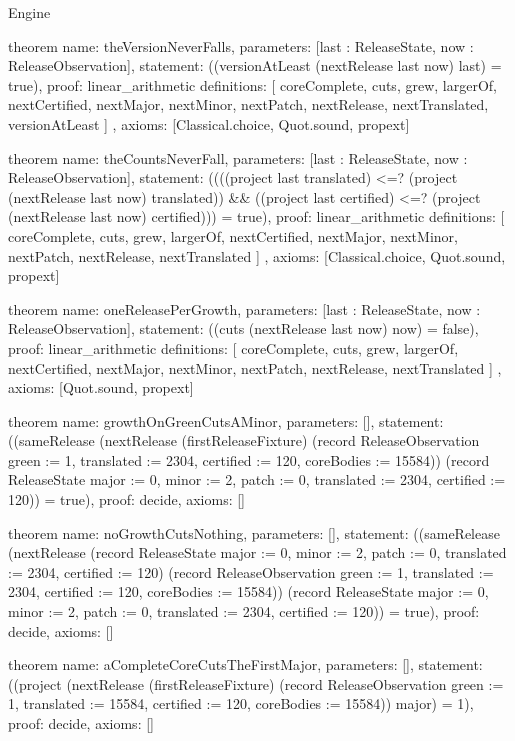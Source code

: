 \begin{lexlean}{Engine}
\begin{semanticmodule}
theorem{
  name: theVersionNeverFalls,
  parameters: [last : ReleaseState, now : ReleaseObservation],
  statement: ((versionAtLeast (nextRelease last now) last) = true),
  proof: linear_arithmetic{
    definitions: [
      coreComplete,
      cuts,
      grew,
      largerOf,
      nextCertified,
      nextMajor,
      nextMinor,
      nextPatch,
      nextRelease,
      nextTranslated,
      versionAtLeast
    ]
  },
  axioms: [Classical.choice, Quot.sound, propext]
}

theorem{
  name: theCountsNeverFall,
  parameters: [last : ReleaseState, now : ReleaseObservation],
  statement: ((((project last translated) <=? (project (nextRelease last now) translated)) && ((project last certified) <=? (project (nextRelease last now) certified))) = true),
  proof: linear_arithmetic{
    definitions: [
      coreComplete,
      cuts,
      grew,
      largerOf,
      nextCertified,
      nextMajor,
      nextMinor,
      nextPatch,
      nextRelease,
      nextTranslated
    ]
  },
  axioms: [Classical.choice, Quot.sound, propext]
}

theorem{
  name: oneReleasePerGrowth,
  parameters: [last : ReleaseState, now : ReleaseObservation],
  statement: ((cuts (nextRelease last now) now) = false),
  proof: linear_arithmetic{
    definitions: [
      coreComplete,
      cuts,
      grew,
      largerOf,
      nextCertified,
      nextMajor,
      nextMinor,
      nextPatch,
      nextRelease,
      nextTranslated
    ]
  },
  axioms: [Quot.sound, propext]
}

theorem{
  name: growthOnGreenCutsAMinor,
  parameters: [],
  statement: ((sameRelease (nextRelease (firstReleaseFixture) (record ReleaseObservation {green := 1, translated := 2304, certified := 120, coreBodies := 15584})) (record ReleaseState {major := 0, minor := 2, patch := 0, translated := 2304, certified := 120})) = true),
  proof: decide{},
  axioms: []
}

theorem{
  name: noGrowthCutsNothing,
  parameters: [],
  statement: ((sameRelease (nextRelease (record ReleaseState {major := 0, minor := 2, patch := 0, translated := 2304, certified := 120}) (record ReleaseObservation {green := 1, translated := 2304, certified := 120, coreBodies := 15584})) (record ReleaseState {major := 0, minor := 2, patch := 0, translated := 2304, certified := 120})) = true),
  proof: decide{},
  axioms: []
}

theorem{
  name: aCompleteCoreCutsTheFirstMajor,
  parameters: [],
  statement: ((project (nextRelease (firstReleaseFixture) (record ReleaseObservation {green := 1, translated := 15584, certified := 120, coreBodies := 15584})) major) = 1),
  proof: decide{},
  axioms: []
}
\end{semanticmodule}
\end{lexlean}
